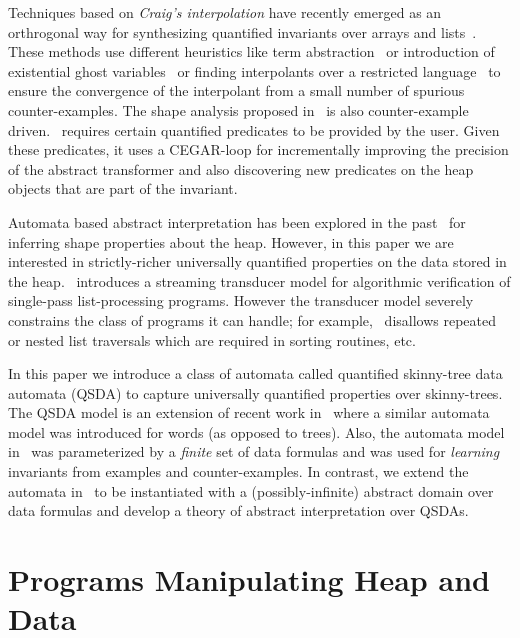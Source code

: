 \documentclass{llncs}
\begin{document}
Techniques based on \emph{Craig's interpolation} have recently emerged as an orthrogonal way for synthesizing quantified invariants over arrays and lists~\cite{mcmillan06,mcmillan08,natasha,podelski}.
These methods use different heuristics like term abstraction~\cite{podelski} or introduction of existential ghost variables~\cite{natasha} or finding interpolants over a restricted language~\cite{mcmillan06,mcmillan08} to ensure the convergence of the interpolant from a small number of spurious counter-examples.
The shape analysis proposed in~\cite{podelski07} is also counter-example driven.~\cite{podelski07} requires certain quantified predicates to be provided by the user. Given these predicates, it uses a CEGAR-loop for incrementally improving the precision of the abstract transformer and also discovering new predicates on the heap objects that are part of the invariant.

Automata based abstract interpretation has been explored in the past~\cite{forest-automata} for inferring shape properties about the heap. However, in this paper we are interested in strictly-richer universally quantified properties on the data stored in the heap.~\cite{streaming-transducer} introduces a streaming transducer model for algorithmic verification of single-pass list-processing programs. However the transducer model severely constrains the class of programs it can handle; for example,~\cite{streaming-transducer} disallows repeated or nested list traversals which are required in sorting routines, etc.

In this paper we introduce a class of automata called quantified skinny-tree data automata (QSDA) to capture universally quantified properties over skinny-trees. The QSDA model is an extension of recent work in~\cite{CAVQDA} where a similar automata model was introduced for words (as opposed to trees). Also,
the automata model in~\cite{CAVQDA} was parameterized by a \emph{finite} set of data formulas and was used for \emph{learning} invariants from examples and counter-examples. In contrast, we extend the automata in~\cite{CAVQDA} to be instantiated with a (possibly-infinite) abstract domain over data formulas and develop a theory of abstract interpretation over QSDAs.










\section{Programs Manipulating Heap and Data}
\end{document}
